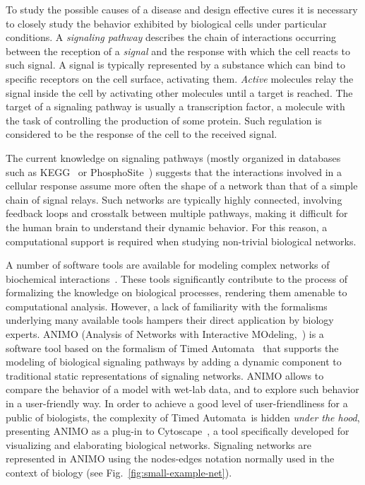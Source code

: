 \documentclass{llncs}
\newcommand{\tas}{Timed Automata}
\begin{document}
To study the possible causes of a disease and design effective cures it is 
necessary to closely study the behavior exhibited by biological cells under particular conditions.
A \emph{signaling pathway} describes the chain of interactions occurring
between the reception of a \emph{signal} and the response with which the cell
reacts to such signal. 
A signal is typically represented by a substance which can bind
to specific receptors on the cell surface, activating them.
\emph{Active} molecules relay the signal inside the cell by activating
other molecules until a target is reached. The target of a signaling pathway is usually a transcription
factor, a molecule with the task of controlling the production of some protein. Such regulation is considered to be the response of the cell to the received signal.

The current knowledge on signaling pathways (mostly organized in databases such as KEGG~\cite{kegg}
or PhosphoSite~\cite{phosphosite}) suggests that the interactions involved in a cellular response assume more often
the shape of a network than that of a simple chain of signal relays.
Such networks are typically highly connected, involving feedback loops and crosstalk
between multiple pathways, making it difficult for the human
brain to understand their dynamic behavior.
For this reason, a computational support is required when studying non-trivial biological networks.

A number of software tools are available
for modeling complex networks of biochemical interactions~\cite{bio-pepa,blenx,copasi,e-cell,gna}.
These tools significantly contribute to the process of formalizing the knowledge on biological
processes, rendering them amenable to computational analysis.
However, a lack of familiarity with the formalisms underlying many available tools
hampers their direct application by biology experts.
ANIMO (Analysis of Networks with Interactive MOdeling,~\cite{animo-site,animo-ieee,animo-gene}) is a software tool
based on the formalism of \tas~\cite{timed-automata-alur} that supports the
modeling of biological signaling pathways
by adding a dynamic component to traditional static representations of signaling networks.
ANIMO allows to compare the behavior of
a model with wet-lab data, and to explore such behavior in a user-friendly way.
In order to achieve a good level of user-friendliness for a public of biologists, the complexity of \tas\ is hidden \emph{under the hood},
presenting ANIMO as a plug-in to Cytoscape~\cite{cytoscape}, a tool specifically developed for visualizing 
and elaborating biological networks. Signaling networks are represented in ANIMO using
the nodes-edges notation normally used in the context of biology (see Fig.~\ref{fig:small-example-net}).
\end{document}
